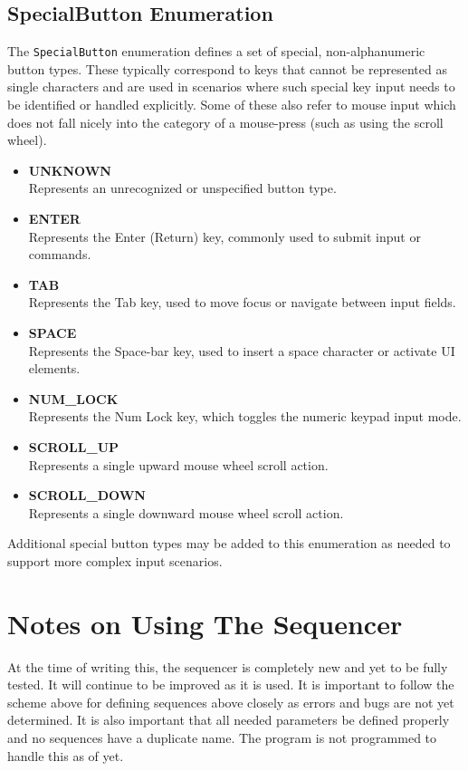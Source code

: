 \subsection{SpecialButton Enumeration} \label{SpecialButton-Enumeration}

The \texttt{SpecialButton} enumeration defines a set of special, non-alphanumeric button types. These typically correspond to keys that cannot be represented as single characters and are used in scenarios where such special key input needs to be identified or handled explicitly. Some of these also refer to mouse input which does not fall nicely into the category of a mouse-press (such as using the scroll wheel).

\begin{itemize}
	\item \textbf{UNKNOWN} \hfill \\
	Represents an unrecognized or unspecified button type.
	
	\item \textbf{ENTER} \hfill \\
	Represents the Enter (Return) key, commonly used to submit input or commands.
	
	\item \textbf{TAB} \hfill \\
	Represents the Tab key, used to move focus or navigate between input fields.
	
	\item \textbf{SPACE} \hfill \\
	Represents the Space-bar key, used to insert a space character or activate UI elements.
	
	\item \textbf{NUM\_LOCK} \hfill \\
	Represents the Num Lock key, which toggles the numeric keypad input mode.
	
	\item \textbf{SCROLL\_UP} \hfill \\
	Represents a single upward mouse wheel scroll action.
	
	\item \textbf{SCROLL\_DOWN} \hfill \\
	Represents a single downward mouse wheel scroll action.
\end{itemize}

\noindent Additional special button types may be added to this enumeration as needed to support more complex input scenarios.




\section{Notes on Using The Sequencer}

At the time of writing this, the sequencer is completely new and yet to be fully tested. It will continue to be improved as it is used. It is important to follow the scheme above for defining sequences above closely as errors and bugs are not yet determined. It is also important that all needed parameters be defined properly and no sequences have a duplicate name. The program is not programmed to handle this as of yet.
